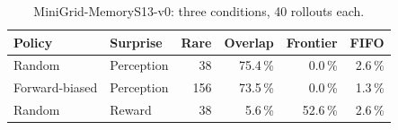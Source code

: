 \begin{table}[t]
\centering
\caption{MiniGrid-MemoryS13-v0: three conditions, 40 rollouts each.}
\label{tab:minigrid}
\begin{tabular}{llrrrr}
\hline
Policy & Surprise & Rare & Overlap & Frontier & FIFO \\
\hline
Random & Perception & 38 & 75.4\,\% & 0.0\,\% & 2.6\,\% \\
Forward-biased & Perception & 156 & 73.5\,\% & 0.0\,\% & 1.3\,\% \\
Random & Reward & 38 & 5.6\,\% & 52.6\,\% & 2.6\,\% \\
\hline
\end{tabular}
\end{table}
